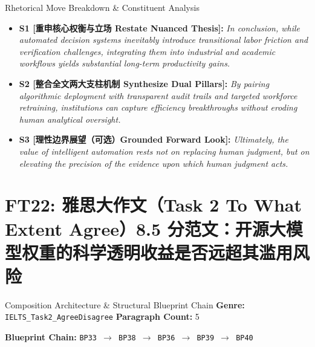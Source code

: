 \begin{TipBox}{Rhetorical Move Breakdown \& Constituent Analysis}
\begin{itemize}[leftmargin=1.5em]
  \item \textbf{S1 [重申核心权衡与立场 Restate Nuanced Thesis]:} \textit{In conclusion, while automated decision systems inevitably introduce transitional labor friction and verification challenges, integrating them into industrial and academic workflows yields substantial long-term productivity gains.}\par{}
  \item \textbf{S2 [整合全文两大支柱机制 Synthesize Dual Pillars]:} \textit{By pairing algorithmic deployment with transparent audit trails and targeted workforce retraining, institutions can capture efficiency breakthroughs without eroding human analytical oversight.}\par{}
  \item \textbf{S3 [理性边界展望（可选）Grounded Forward Look]:} \textit{Ultimately, the value of intelligent automation rests not on replacing human judgment, but on elevating the precision of the evidence upon which human judgment acts.}\par{}
\end{itemize}
\end{TipBox}
\medskip
\clearpage
\section{FT22: 雅思大作文（Task 2 To What Extent Agree）8.5 分范文：开源大模型权重的科学透明收益是否远超其滥用风险}\label{comp:FT22}
\begin{ConceptBox}{Composition Architecture \& Structural Blueprint Chain}
\textbf{Genre:} \texttt{IELTS\_Task2\_AgreeDisagree} \quad \textbf{Paragraph Count:} 5\par
\textbf{Blueprint Chain:} \texttt{BP33 $\to$ BP38 $\to$ BP36 $\to$ BP39 $\to$ BP40}
\end{ConceptBox}
